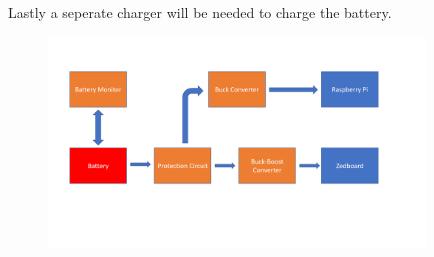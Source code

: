 Lastly a seperate charger will be needed to charge the battery.

\begin{figure}\label{Overview}
\centering
\includegraphics[width=10cm]{img/Power_Diagram.png}
\end{figure}
